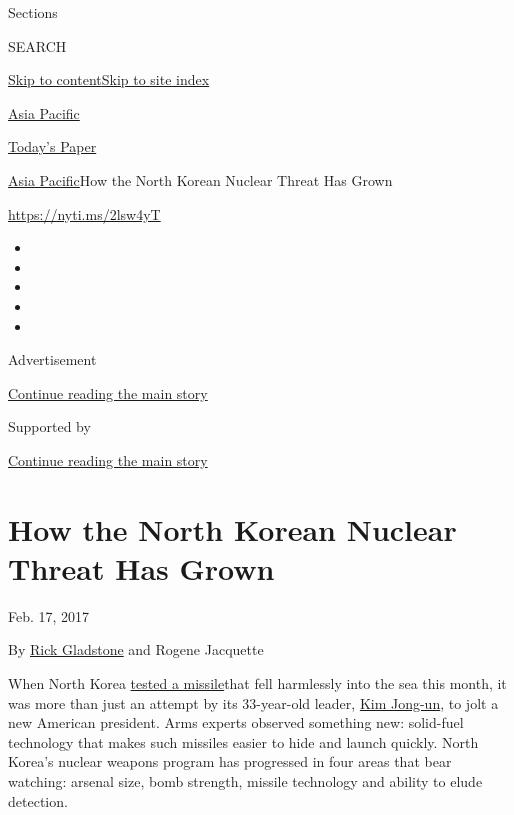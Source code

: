 Sections

SEARCH

\protect\hyperlink{site-content}{Skip to
content}\protect\hyperlink{site-index}{Skip to site index}

\href{https://www.nytimes.com/section/world/asia}{Asia Pacific}

\href{https://myaccount.nytimes.com/auth/login?response_type=cookie\&client_id=vi}{}

\href{https://www.nytimes.com/section/todayspaper}{Today's Paper}

\href{/section/world/asia}{Asia Pacific}\textbar{}How the North Korean
Nuclear Threat Has Grown

\url{https://nyti.ms/2lsw4yT}

\begin{itemize}
\item
\item
\item
\item
\item
\end{itemize}

Advertisement

\protect\hyperlink{after-top}{Continue reading the main story}

Supported by

\protect\hyperlink{after-sponsor}{Continue reading the main story}

\hypertarget{how-the-north-korean-nuclear-threat-has-grown}{%
\section{How the North Korean Nuclear Threat Has
Grown}\label{how-the-north-korean-nuclear-threat-has-grown}}

Feb. 17, 2017

By \href{https://www.nytimes.com/by/rick-gladstone}{Rick Gladstone} and
Rogene Jacquette

When North Korea
\href{https://www.nytimes.com/2017/02/11/world/asia/north-korea-missile-test-trump.html}{tested
a missile}that fell harmlessly into the sea this month, it was more than
just an attempt by its 33-year-old leader,
\href{https://www.nytimes.com/topic/person/kim-jongun}{Kim Jong-un}, to
jolt a new American president. Arms experts observed something new:
solid-fuel technology that makes such missiles easier to hide and launch
quickly. North Korea's nuclear weapons program has progressed in four
areas that bear watching: arsenal size, bomb strength, missile
technology and ability to elude detection.

